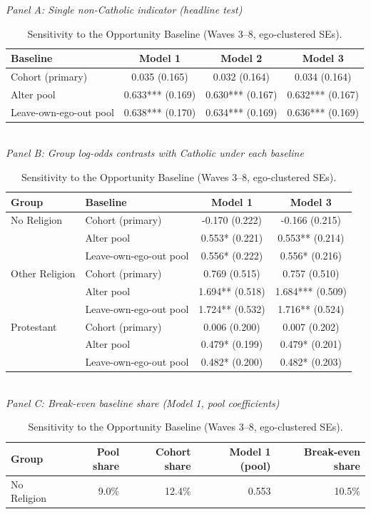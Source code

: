 \begin{table}[htbp]
\caption{\label{tab:baseline-sensitivity}Sensitivity to the Opportunity Baseline (Waves 3--8, ego-clustered SEs).}
\centering
\scriptsize
\textit{Panel A: Single non-Catholic indicator (headline test)}\\[2pt]
\begin{tabular}{lccc}
\toprule
Baseline & Model 1 & Model 2 & Model 3 \\
\midrule
Cohort (primary) & 0.035 (0.165) & 0.032 (0.164) & 0.034 (0.164) \\
Alter pool & 0.633*** (0.169) & 0.630*** (0.167) & 0.632*** (0.167) \\
Leave-own-ego-out pool & 0.638*** (0.170) & 0.634*** (0.169) & 0.636*** (0.169) \\
\bottomrule
\end{tabular}
\\[8pt]
\textit{Panel B: Group log-odds contrasts with Catholic under each baseline}\\[2pt]
\begin{tabular}{llcc}
\toprule
Group & Baseline & Model 1 & Model 3 \\
\midrule
No Religion & Cohort (primary) & -0.170 (0.222) & -0.166 (0.215) \\
 & Alter pool & 0.553* (0.221) & 0.553** (0.214) \\
 & Leave-own-ego-out pool & 0.556* (0.222) & 0.556* (0.216) \\
Other Religion & Cohort (primary) & 0.769 (0.515) & 0.757 (0.510) \\
 & Alter pool & 1.694** (0.518) & 1.684*** (0.509) \\
 & Leave-own-ego-out pool & 1.724** (0.532) & 1.716** (0.524) \\
Protestant & Cohort (primary) & 0.006 (0.200) & 0.007 (0.202) \\
 & Alter pool & 0.479* (0.199) & 0.479* (0.201) \\
 & Leave-own-ego-out pool & 0.482* (0.200) & 0.482* (0.203) \\
\bottomrule
\end{tabular}
\\[8pt]
\textit{Panel C: Break-even baseline share (Model 1, pool coefficients)}\\[2pt]
\begin{tabular}{lrrrr}
\toprule
Group & Pool share & Cohort share & Model 1 (pool) & Break-even share \\
\midrule
No Religion & 9.0\% & 12.4\% & 0.553 & 10.5\% \\

\end{tabular}
\end{table}
